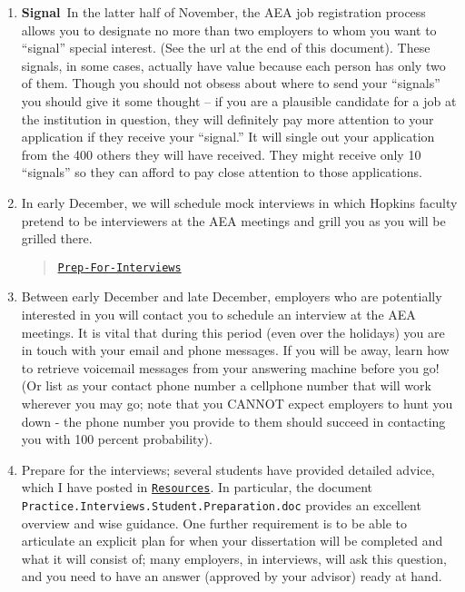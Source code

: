 \documentclass{\classes/econtex}
\begin{document}
\begin{enumerate}
\item \ifdvi\hypertarget{Signal}{\textbf{Signal}~}\fi In the latter half of November, the AEA job registration process 
  allows you to designate no more than two employers to whom you want
  to ``signal'' special interest.  (See the url at the end of this
  document).  These signals, in some cases, actually have value because 
  each person has only two of them.  Though you should not obsess about 
  where to send your ``signals'' you should give it some thought -- if you
  are a plausible candidate for a job at the institution in question, they
  will definitely pay more attention to your application if they receive your 
  ``signal.''  It will single out your application from the 400 others they will have received.
  They might receive only 10 ``signals'' so they can afford to pay close attention
  to those applications.

  
  \hypertarget{Mock-Interviews}{}
\item In early December, we will schedule mock interviews in which
  Hopkins faculty pretend to be interviewers at the AEA meetings and
  grill you as you will be grilled there.

  \begin{quote}
    \href{\pageurl/Steps#Prep-For-Interviews}{\texttt{Prep-For-Interviews}}
    \end{quote}
  
  \hypertarget{Be-Reachable}{}
\item Between early December and late December, employers who are
  potentially interested in you will contact you to schedule an
  interview at the AEA meetings.  It is vital that during this period
  (even over the holidays) you are in touch with your email and phone
  messages.  If you will be away, learn how to retrieve voicemail
  messages from your answering machine before you go!  (Or list as
  your contact phone number a cellphone number that will work wherever
  you may go; note that you CANNOT expect employers to hunt you down -
  the phone number you provide to them should succeed in contacting
  you with 100 percent probability).
  
  \hypertarget{Prep-For-Interviews}{} %
\item Prepare for the interviews; several students have provided
  detailed advice, which I have posted in \href{\treeurl/Resources}{\texttt{Resources}}.  In particular, the document
  \texttt{Practice.Interviews.Student.Preparation.doc} provides an
  excellent overview and wise guidance. One further requirement is to be
  able to articulate an explicit plan for when your dissertation will
  be completed and what it will consist of; many employers, in
  interviews, will ask this question, and you need to have an answer
  (approved by your advisor) ready at hand.


\end{enumerate}
\end{document}
